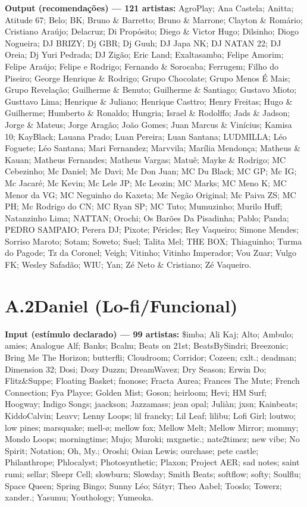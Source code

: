 \begin{apendicesenv}
\noindent\textbf{Output (recomendações) --- 121 artistas:} AgroPlay; Ana Castela; Anitta; Atitude 67; Belo; BK; Bruno \& Barretto; Bruno \& Marrone; Clayton \& Romário; Cristiano Araújo; Delacruz; Di Propósito; Diego \& Victor Hugo; Dilsinho; Diogo Nogueira; DJ BRIZY; Dj GBR; Dj Guuh; DJ Japa NK; DJ NATAN 22; DJ Oreia; Dj Yuri Pedrada; DJ Zigão; Eric Land; Exaltasamba; Felipe Amorim; Felipe Araújo; Felipe e Rodrigo; Fernando \& Sorocaba; Ferrugem; Filho do Piseiro; George Henrique \& Rodrigo; Grupo Chocolate; Grupo Menos É Mais; Grupo Revelação; Guilherme \& Benuto; Guilherme \& Santiago; Gustavo Mioto; Gusttavo Lima; Henrique \& Juliano; Henrique Casttro; Henry Freitas; Hugo \& Guilherme; Humberto \& Ronaldo; Hungria; Israel \& Rodolffo; Jads \& Jadson; Jorge \& Mateus; Jorge Aragão; João Gomes; Juan Marcus \& Vinícius; Kamisa 10; KayBlack; Lauana Prado; Luan Pereira; Luan Santana; LUDMILLA; Léo Foguete; Léo Santana; Mari Fernandez; Marvvila; Marília Mendonça; Matheus \& Kauan; Matheus Fernandes; Matheus Vargas; Matuê; Mayke \& Rodrigo; MC Cebezinho; Mc Daniel; Mc Davi; Mc Don Juan; MC Du Black; MC GP; Mc IG; Mc Jacaré; Mc Kevin; Mc Lele JP; Mc Leozin; MC Marks; MC Meno K; MC Menor da VG; MC Neguinho do Kaxeta; Mc Negão Original; Mc Paiva ZS; MC PH; Mc Rodrigo do CN; MC Ryan SP; MC Tuto; Mumuzinho; Murilo Huff; Natanzinho Lima; NATTAN; Orochi; Os Barões Da Pisadinha; Pablo; Panda; PEDRO SAMPAIO; Perera DJ; Pixote; Péricles; Rey Vaqueiro; Simone Mendes; Sorriso Maroto; Sotam; Soweto; Suel; Talita Mel; THE BOX; Thiaguinho; Turma do Pagode; Tz da Coronel; Veigh; Vitinho; Vitinho Imperador; Vou Zuar; Vulgo FK; Wesley Safadão; WIU; Yan; Zé Neto \& Cristiano; Zé Vaqueiro.

\section*{A.2\quad Daniel (Lo-fi/Funcional)}

\noindent\textbf{Input (estímulo declarado) --- 99 artistas:} \$imba; Ali Kaj; Alto; Ambulo; amies; Analogue Alf; Banks; Bcalm; Beats on 21st; BeatsBySindri; Breezonic; Bring Me The Horizon; butterfli; Cloudroom; Corridor; Cozeen; cxlt.; deadman; Dimension 32; Dosi; Dozy Duzzn; DreamWavez; Dry Season; Erwin Do; Flitz\&Suppe; Floating Basket; fnonose; Fracta Aurea; Frances The Mute; French Connection; Fya Playce; Golden Mist; Goson; heirloom; Hevi; HM Surf; Hoogway; Indigo Songs; jaackson; Jazzamass; jean opal; Juliàn; jxsn; Kainbeats; KiddoCalvin; Leavv; Lenny Loops; lil francky; Lil Leaf; lilibu; Lofi Girl; loutwo; low pines; marsquake; mell-ø; mellow fox; Mellow Melt; Mellow Mirror; mommy; Mondo Loops; morningtime; Mujo; Muroki; mxgnetic.; nate2timez; new vibe; No Spirit; Notation; Oh, My.; Oroshi; Osian Lewis; ourchase; pete castle; Philanthrope; Phlocalyst; Photosynthetic; Plaxon; Project AER; sad notes; saint rumi; sellar; Sleepr Cell; slowburn; Slowday; Smith Beats; softflow; softy; Soulflu; Space Queen; Spring Bingo; Sunny Léo; Sátyr; Theo Aabel; Tooslo; Towerz; xander.; Yasumu; Youthology; Yumeoka.



\end{apendicesenv}
